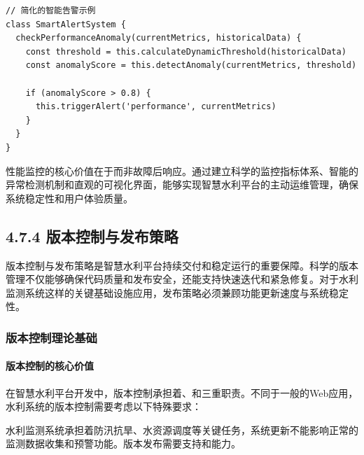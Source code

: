 \begin{lstlisting}[style=javascript]
// 简化的智能告警示例
class SmartAlertSystem {
  checkPerformanceAnomaly(currentMetrics, historicalData) {
    const threshold = this.calculateDynamicThreshold(historicalData)
    const anomalyScore = this.detectAnomaly(currentMetrics, threshold)
    
    if (anomalyScore > 0.8) {
      this.triggerAlert('performance', currentMetrics)
    }
  }
}
\end{lstlisting}

 性能监控的核心价值在于而非故障后响应。通过建立科学的监控指标体系、智能的异常检测机制和直观的可视化界面，能够实现智慧水利平台的主动运维管理，确保系统稳定性和用户体验质量。

\hypertarget{ux7248ux672cux63a7ux5236ux4e0eux53d1ux5e03ux7b56ux7565}{%
\subsection{4.7.4 版本控制与发布策略}\label{ux7248ux672cux63a7ux5236ux4e0eux53d1ux5e03ux7b56ux7565}}

版本控制与发布策略是智慧水利平台持续交付和稳定运行的重要保障。科学的版本管理不仅能够确保代码质量和发布安全，还能支持快速迭代和紧急修复。对于水利监测系统这样的关键基础设施应用，发布策略必须兼顾功能更新速度与系统稳定性。

\hypertarget{ux7248ux672cux63a7ux5236ux7406ux8bbaux57faux7840}{%
\subsubsection{版本控制理论基础}\label{ux7248ux672cux63a7ux5236ux7406ux8bbaux57faux7840}}

\hypertarget{ux7248ux672cux63a7ux5236ux7684ux6838ux5fc3ux4ef7ux503c}{%
\paragraph{版本控制的核心价值}\label{ux7248ux672cux63a7ux5236ux7684ux6838ux5fc3ux4ef7ux503c}}

在智慧水利平台开发中，版本控制承担着、和三重职责。不同于一般的Web应用，水利系统的版本控制需要考虑以下特殊要求：


水利监测系统承担着防汛抗旱、水资源调度等关键任务，系统更新不能影响正常的监测数据收集和预警功能。版本发布需要支持和能力。

